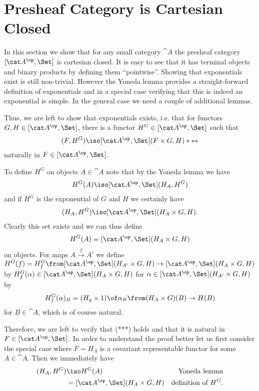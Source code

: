 \documentclass{article}
\begin{document}
\section{Presheaf Category is Cartesian Closed}
In this section we show that for any small category $\cat A$ the presheaf category $[\cat A^\op,\Set]$ is cartesian closed. It is easy to see that it has terminal objects and binary products by defining them ``pointwise''. Showing that exponentials exist is still non-trivial. However the Yoneda lemma provides a straight-forward definition of exponentials and in a special case verifying that this is indeed an exponential is simple. In the general case we need a couple of additional lemmas.

Thus, we are left to show that exponentials exists, i.e. that for functors $G,H\in[\cat A^\op,\Set]$, there is a functor $H^G\in[\cat A^\op,\Set]$ such that
\begin{align*}
  [\cat A^\op,\Set](F,H^G)\iso [\cat A^\op,\Set](F\times G,H)***
\end{align*}
naturally in $F\in[\cat A^\op,\Set]$.

To define $H^G$ on objects $A\in\cat A$ note that by the Yoneda lemma we have
\begin{align*}
  H^G(A)\iso [\cat A^\op,\Set](H_A,H^G)
\end{align*}
and if $H^G$ is the exponential of $G$ and $H$ we certainly have
\begin{align*}
  [\cat A^\op,\Set](H_A,H^G)\iso [\cat A^\op,\Set](H_A\times G,H).
\end{align*}
Clearly this set exists and we can thus define
\begin{align*}
  H^G(A)=[\cat A^\op,\Set](H_A\times G,H)
\end{align*}
on objects.
For maps $A\xrightarrow{f}A'$ we define $H^G(f)=H^G_f\from [\cat A^\op,\Set](H_{A'}\times G,H)\to[\cat A^\op,\Set](H_A\times G,H)$ by
$H^G_f(\alpha)\in[\cat A^\op,\Set](H_A\times G,H)$ for $\alpha\in [\cat A^\op,\Set](H_{A'}\times G,H)$ by
\begin{align*}
  H^G_f(\alpha)_B = (H_g\times 1)\of \alpha_B\from (H_{A}\times G)(B)\to H(B)
\end{align*}
for $B\in\cat A$, which is of course natural.

Therefore, we are left to verify that (***) holds and that it is natural in $F\in[\cat A^\op,\Set]$.
In order to understand the proof better let us first consider the special case where $F=H_A$ is a covariant representable functor for some $A\in\cat A$. Then we immediately have
\begin{align*}
  [\cat A^\op,\Set](H_A,H^G)&\iso H^G(A)&\text{Yoneda lemma}\\
  &=[\cat A^\op,\Set](H_A\times G,H)&\text{definition of }H^G.
\end{align*}
\end{document}
